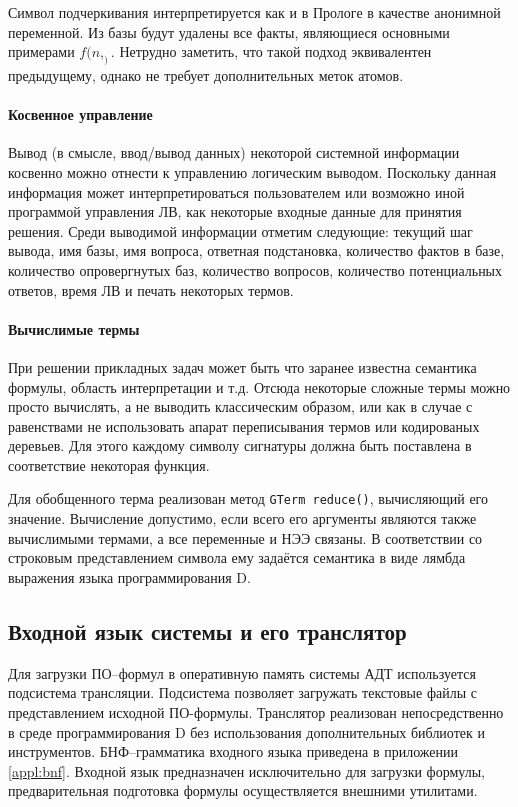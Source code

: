 Символ подчеркивания интерпретируется как и в Прологе в качестве анонимной переменной. Из базы будут удалены все факты, являющиеся основными примерами  $f(n,_)$. Нетрудно заметить, что такой подход эквивалентен предыдущему, однако не требует дополнительных меток атомов.

\paragraph{Косвенное управление} Вывод (в смысле, ввод/вывод данных) некоторой системной информации косвенно можно отнести к управлению логическим выводом. Поскольку данная информация может интерпретироваться пользователем или возможно иной программой управления ЛВ, как некоторые входные данные для принятия решения. Среди выводимой информации отметим следующие: текущий шаг вывода, имя базы, имя вопроса, ответная подстановка, количество фактов в базе, количество опровергнутых баз, количество вопросов, количество потенциальных ответов, время ЛВ и печать некоторых термов.

\paragraph{Вычислимые термы} При решении прикладных задач может быть что заранее известна семантика формулы, область интерпретации и т.д. Отсюда некоторые сложные термы можно просто вычислять, а не выводить классическим образом, или как в случае с равенствами не использовать апарат переписывания термов или кодированых деревьев. Для этого каждому символу сигнатуры должна быть поставлена в соответствие некоторая функция.

Для обобщенного терма реализован метод \texttt{GTerm reduce()}, вычисляющий его значение. Вычисление допустимо, если всего его аргументы являются также вычислимыми термами, а все переменные и НЭЭ связаны. В соответствии со строковым представлением символа ему задаётся семантика в виде лямбда выражения языка программирования D.

\subsection{Входной язык системы и его транслятор}
Для загрузки ПО--формул в оперативную память системы АДТ используется подсистема трансляции. Подсистема позволяет загружать текстовые файлы с представлением исходной ПО-формулы. Транслятор реализован непосредственно в среде программирования D без использования дополнительных библиотек и инструментов. БНФ--грамматика входного языка приведена в приложении \ref{appl:bnf}. Входной язык предназначен исключительно для загрузки формулы, предварительная подготовка формулы осуществляется внешними утилитами.

